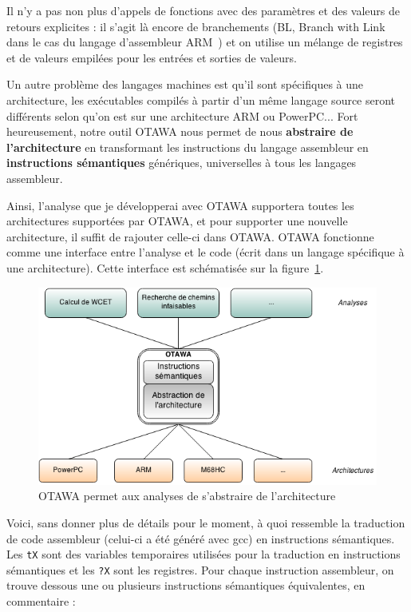 \documentclass[french]{article}
\begin{document}
  Il n'y a pas non plus d'appels de fonctions avec des paramètres et des valeurs de retours explicites : il s'agit là encore de branchements (BL, Branch with Link dans le cas du langage d'assembleur ARM~\cite{ARM instruction set}) et on utilise un mélange de registres et de valeurs empilées pour les entrées et sorties de valeurs.

  Un autre problème des langages machines est qu'il sont spécifiques à une architecture, les exécutables compilés à partir d'un même langage source seront différents selon qu'on est sur une architecture ARM ou PowerPC... Fort heureusement, notre outil OTAWA nous permet de nous \textbf{abstraire de l'architecture} en transformant les instructions du langage assembleur en \textbf{instructions sémantiques} génériques, universelles à tous les langages assembleur.

  Ainsi, l'analyse que je développerai avec OTAWA supportera toutes les architectures supportées par OTAWA, et pour supporter une nouvelle architecture, il suffit de rajouter celle-ci dans OTAWA. OTAWA fonctionne comme une interface entre l'analyse et le code (écrit dans un langage spécifique à une architecture). Cette interface est schématisée sur la figure~\ref{abstraction architecture}.

  \begin{figure}
    \centering
    \includegraphics[width=\textwidth]{pictures/otawa_abstraction_architecture.png}
    \caption{OTAWA permet aux analyses de s'abstraire de l'architecture}
    \label{abstraction architecture}
  \end{figure}

  Voici, sans donner plus de détails pour le moment, à quoi ressemble la traduction de code assembleur (celui-ci a été généré avec gcc) en instructions sémantiques. Les \texttt{tX} sont des variables temporaires utilisées pour la traduction en instructions sémantiques et les \texttt{?X} sont les registres. Pour chaque instruction assembleur, on trouve dessous une ou plusieurs instructions sémantiques équivalentes, en commentaire :
\end{document}

